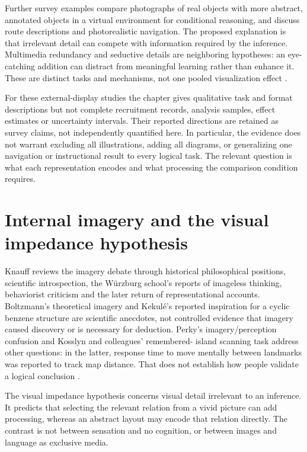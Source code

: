 Further survey examples compare photographs of real objects with more
abstract, annotated objects in a virtual environment for conditional
reasoning, and discuss route descriptions and photorealistic navigation.
The proposed explanation is that irrelevant detail can compete with
information required by the inference. Multimedia redundancy and seductive
details are neighboring hypotheses: an eye-catching addition can distract
from meaningful learning rather than enhance it. These are distinct tasks
and mechanisms, not one pooled visualization effect
\parencite[p.~737]{Knauff2021VisualizationRationality}.

For these external-display studies the chapter gives qualitative task and
format descriptions but not complete recruitment records, analysis samples,
effect estimates or uncertainty intervals. Their reported directions are
retained as survey claims, not independently quantified here. In particular,
the evidence does not warrant excluding all illustrations, adding all
diagrams, or generalizing one navigation or instructional result to every
logical task. The relevant question is what each representation encodes
and what processing the comparison condition requires.

\section{Internal imagery and the visual impedance hypothesis}
\label{sec:p19-rat133-impedance}

Knauff reviews the imagery debate through historical philosophical positions,
scientific introspection, the W\"urzburg school's reports of imageless
thinking, behaviorist criticism and the later return of representational
accounts. Boltzmann's theoretical imagery and Kekul\'e's reported inspiration
for a cyclic benzene structure are scientific anecdotes, not controlled
evidence that imagery caused discovery or is necessary for deduction.
Perky's imagery/perception confusion and Kosslyn and colleagues' remembered-
island scanning task address other questions: in the latter, response time
to move mentally between landmarks was reported to track map distance.
That does not establish how people validate a logical conclusion
\parencite[pp.~737--738]{Knauff2021VisualizationRationality}.

The visual impedance hypothesis concerns visual detail irrelevant to an
inference. It predicts that selecting the relevant relation from a vivid
picture can add processing, whereas an abstract layout may encode that
relation directly. The contrast is not between sensation and no cognition,
or between images and language as exclusive media.

